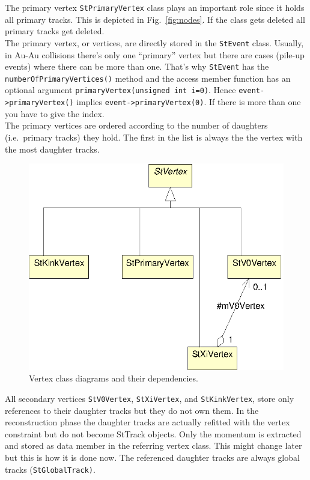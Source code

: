 \documentclass[twoside]{article}
\begin{document}
The primary vertex \texttt{StPrimaryVertex} class plays an important
role since it holds all primary tracks. This is depicted in
Fig.~\ref{fig:nodes}. If the
class gets deleted all primary tracks get deleted. \\
The primary vertex, or vertices, are directly stored in the
\texttt{StEvent} class. Usually, in Au-Au collisions there's only one
``primary'' vertex but there are cases (pile-up events) where there
can be more than one.  That's why \texttt{StEvent} has the
\texttt{numberOfPrimaryVertices()} method and the access member
function has an optional argument \texttt{primaryVertex(unsigned int
    i=0)}.  Hence \texttt{event->primaryVertex()} implies
\texttt{event->primaryVertex(0)}. If there is more than one you have
to give the index.\\
The primary vertices are ordered according to the number of daughters
(i.e.~primary tracks) they hold. The first in the list is always the
the vertex with the most daughter tracks. 
\begin{figure}[htb]
    \begin{center}
        \includegraphics{vertex.eps}
        \caption{Vertex class diagrams and their dependencies.}
        \label{fig:vertex}
    \end{center}
\end{figure}

All secondary vertices \texttt{StV0Vertex}, \texttt{StXiVertex}, and
\texttt{StKinkVertex}, store only references to their daughter tracks
but they do not own them. In the reconstruction phase the daughter
tracks are actually refitted with the vertex constraint but do not
become StTrack objects. Only the momentum is extracted and stored as
data member in the referring vertex class. This might change later but
this is how it is done now. The referenced daughter tracks are always
global tracks (\texttt{StGlobalTrack)}.
\end{document}
